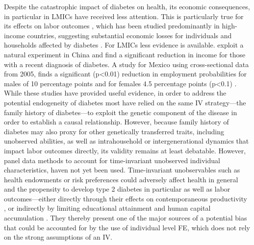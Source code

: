 \documentclass[12pt,english]{article}
\begin{document}
Despite the catastrophic impact of diabetes on health, its economic consequences, in particular in \acp{LMIC} have received less attention. This is particularly true for its effects on labor outcomes \parencite{Seuring2015a}, which has been studied predominantly in high-income countries, suggesting substantial economic losses for individuals and households affected by diabetes \parencite{Brown2005,Brown2014,BrownIII2011,Minor2011,Minor2013,Minor2015,Latif2009}. For \acp{LMIC} less evidence is available. \textcite{Liu2014} exploit a natural experiment in China and find a significant reduction in income for those with a recent diagnosis of diabetes. A study for Mexico using cross-sectional data from 2005, finds a significant (p<0.01) reduction in employment probabilities for males of 10 percentage points and for females 4.5 percentage points (p<0.1) \parencite{Seuring2015}. While these studies have provided useful evidence, in order to address the potential endogeneity of diabetes most have relied on the same \ac{IV} strategy---the family history of diabetes---to exploit the genetic component of the disease in order to establish a causal relationship. However, because family history of diabetes may also proxy for other genetically transferred traits, including unobserved abilities, as well as  intrahousehold or intergenerational dynamics that impact labor outcomes directly, its validity remains at least debatable. However, panel data methods to account for time-invariant unobserved individual characteristics, haven not yet been used. Time-invariant unobservables such as health endowments or risk preferences could adversely affect health in general and the propensity to develop type 2 diabetes in particular \parencite{VanEwijk2011,Sotomayor2013,Li2010b} as well as labor outcomes---either directly through their effects on contemporaneous productivity \parencite{Currie2013}, or indirectly by limiting educational attainment and human capital accumulation \parencite{Ayyagari2011a}. They thereby present one of the major sources of a potential bias that could be accounted for by the use of individual level \ac{FE}, which does not rely on the strong assumptions of an \ac{IV}.
\end{document}
